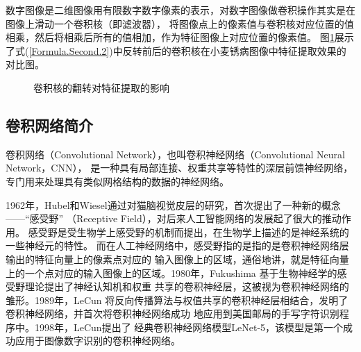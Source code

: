   数字图像是二维图像用有限数字数字像素的表示，对数字图像做卷积操作其实是在图像上滑动一个卷积核（即滤波器），
  将图像点上的像素值与卷积核对应位置的值相乘，然后将相乘后所有的值相加，作为特征图像上对应位置的像素值。
  图\ref{Figure.Second.1}展示了式(\ref{Formula.Second.2})中反转前后的卷积核在小麦锈病图像中特征提取效果的对比图。
  \begin{figure}[H]
    \centering %
    \caption{卷积核的翻转对特征提取的影响}
    \label{Figure.Second.1}
  \end{figure}
  

  
  \subsection{\hei\xiaosan\textbf{卷积网络简介}}
    卷积网络（Convolutional Network），也叫卷积神经网络（Convolutional Neural Network，CNN），
    是一种具有局部连接、权重共享等特性的深层前馈神经网络，专门用来处理具有类似网格结构的数据的神经网络。
    

    1962年，Hubel和Wiesel通过对猫脑视觉皮层的研究，首次提出了一种新的概念——“感受野”
    （Receptive Field），对后来人工智能网络的发展起了很大的推动作用。
    感受野是受生物学上感受野的机制而提出，在生物学上描述的是神经系统的一些神经元的特性。
    而在人工神经网络中，感受野指的是指的是卷积神经网络层输出的特征向量上的像素点对应的
    输入图像上的区域，通俗地讲，就是特征向量上的一个点对应的输入图像上的区域。1980年，Fukushima
    基于生物神经学的感受野理论提出了神经认知机和权重
    共享的卷积神经层，这被视为卷积神经网络的雏形。1989年，LeCun
    将反向传播算法与权值共享的卷积神经层相结合，发明了卷积神经网络，并首次将卷积神经网络成功
    地应用到美国邮局的手写字符识别程序中。1998年，LeCun提出了
    经典卷积神经网络模型LeNet-5，该模型是第一个成功应用于图像数字识别的卷积神经网络。
    
